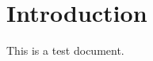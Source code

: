\documentclass{article} %
\begin{document}

\section{Introduction}
This is a test document.
\end{document}

